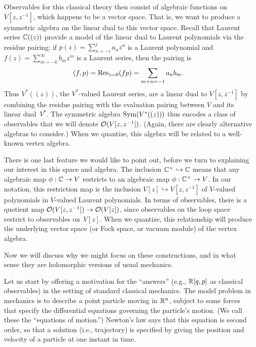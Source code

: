 \documentclass[11pt]{amsart}
\begin{document}
Observables for this classical theory then consist of algebraic functions on $V[z,z^{-1}]$, 
which happens to be a vector space.
That is, we want to produce a symmetric algebra on the linear dual to this vector space.
Recall that Laurent series $\mathbb C((z))$ provide a model of the linear dual to Laurent polynomials via the residue pairing: if $p(z) = \sum_{n = -i}^j a_n z^n$ is a Laurent polynomial and $f(z) = \sum_{m = -k}^\infty b_m z^m$ is a Laurent series, then the pairing is
\[
(f, p) = {\rm Res}_{z=0}(f p) = \sum_{m+n=-1} a_n b_m.
\]
Thus $V^* ((z))$, the $V^*$-valued Laurent series, are a linear dual to $V[z,z^{-1}]$ by combining the residue pairing with the evaluation pairing between $V$ and its linear dual~$V^*$.
The symmetric algebra $\operatorname{Sym}(V^* ((z)))$ thus encodes a class of observables that we will denote $\mathcal O(V[z,z^{-1}])$.
(Again, there are clearly alternative algebras to consider.)
When we quantize, this algebra will be related to a well-known vertex algebra.

There is one last feature we would like to point out, before we turn to explaining our interest in this space and algebra.
The inclusion $\mathbb C^\times \hookrightarrow \mathbb C$ means that any algebraic map  $\phi: \mathbb C \to V$ restricts to an algebraic map $\phi: \mathbb C^\times \to V$.
In our notation, this restriction map is the inclusion $V[z] \hookrightarrow V[z,z^{-1}]$ of $V$-valued polynomials in $V$-valued Laurent polynomials.
In terms of observables, there is a quotient map $\mathcal O(V[z,z^{-1}]) \to \mathcal O(V[z])$, since observables on the loop space restrict to observables on~$V[z]$.
When we quantize, this relationship will produce the underlying vector space (or Fock space, or vacuum module) of the vertex algebra.

Now we will discuss why we might focus on these constructions,
and in what sense they are holomorphic versions of usual mechanics.

Let us start by offering a motivation for the ``answers'' (e.g., $\mathbb R[q,p]$ as classical observables) in the setting of standard classical mechanics.
The model problem in mechanics is to describe a point particle moving in $\mathbb R^n$,
subject to some forces that specify the differential equations governing the particle's motion.
(We call these the ``equations of motion.'')
Newton's law says that this equation is second order, so that a solution (i.e., trajectory) is specified by giving the position and velocity of a particle at one instant in time.
\end{document}
